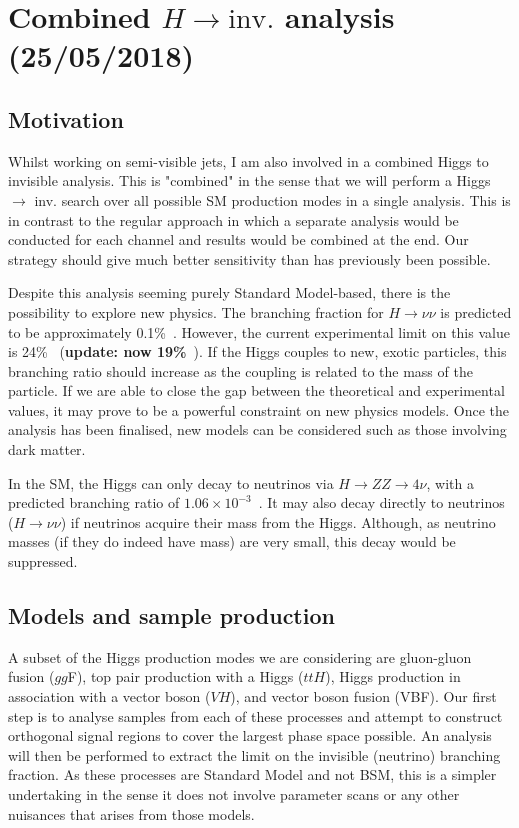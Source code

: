 
\chapter{Combined \texorpdfstring{$H \rightarrow \mathrm{inv.}$}{Higgs to invisible} analysis (25/05/2018)}

\section{Motivation}

Whilst working on semi-visible jets, I am also involved in a combined Higgs to invisible analysis. This is "combined" in the sense that we will perform a Higgs $\rightarrow$ inv. search over all possible SM production modes in a single analysis. This is in contrast to the regular approach in which a separate analysis would be conducted for each channel and results would be combined at the end. Our strategy should give much better sensitivity than has previously been possible.

Despite this analysis seeming purely Standard Model-based, there is the possibility to explore new physics. The branching fraction for $H \rightarrow \nu\nu$ is predicted to be approximately 0.1\%~\cite{Heinemeyer:1559921}. However, the current experimental limit on this value is 24\%~\cite{Khachatryan:2016whc} (\textbf{update: now 19\%}~\cite{Sirunyan:2018owy}). If the Higgs couples to new, exotic particles, this branching ratio should increase as the coupling is related to the mass of the particle. If we are able to close the gap between the theoretical and experimental values, it may prove to be a powerful constraint on new physics models. Once the analysis has been finalised, new models can be considered such as those involving dark matter.

In the SM, the Higgs can only decay to neutrinos via $H \rightarrow ZZ \rightarrow 4\nu$, with a predicted branching ratio of $1.06 \times 10^{-3}$~\cite{Heinemeyer:1559921}. It may also decay directly to neutrinos ($H \rightarrow \nu\nu$) if neutrinos acquire their mass from the Higgs. Although, as neutrino masses (if they do indeed have mass) are very small, this decay would be suppressed.


\section{Models and sample production}

A subset of the Higgs production modes we are considering are gluon-gluon fusion ($gg$F), top pair production with a Higgs ($ttH$), Higgs production in association with a vector boson ($VH$), and vector boson fusion (VBF). Our first step is to analyse samples from each of these processes and attempt to construct orthogonal signal regions to cover the largest phase space possible. An analysis will then be performed to extract the limit on the invisible (neutrino) branching fraction. As these processes are Standard Model and not BSM, this is a simpler undertaking in the sense it does not involve parameter scans or any other nuisances that arises from those models.

